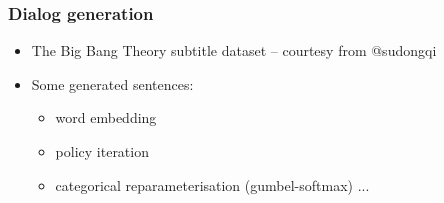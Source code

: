 \documentclass{beamer}
\begin{document}

\begin{frame}
\frametitle{Dialog generation}
\begin{itemize}
\item The Big Bang Theory subtitle dataset -- courtesy from @sudongqi
\item Some generated sentences:
	\begin{itemize}
		\item word embedding
		\item policy iteration
		\item categorical reparameterisation (gumbel-softmax) ...

	\end{itemize}
\end{itemize}
\end{frame}






\end{document}
